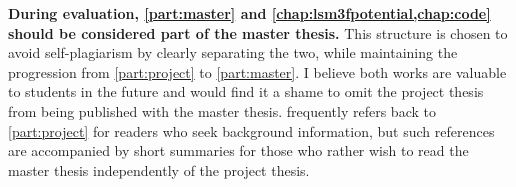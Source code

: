\textbf{During evaluation, \cref{part:master} and \cref{chap:lsm3fpotential,chap:code} should be considered part of the master thesis.}
This structure is chosen to avoid self-plagiarism by clearly separating the two,
while maintaining the progression from \cref{part:project} to \cref{part:master}.
I believe both works are valuable to students in the future and would find it a shame to omit the project thesis from being published with the master thesis.
 frequently refers back to \cref{part:project} for readers who seek background information,
but such references are accompanied by short summaries for those who rather wish to read the master thesis independently of the project thesis.

\mbox{}\vfill
\begin{center}
\end{center}
